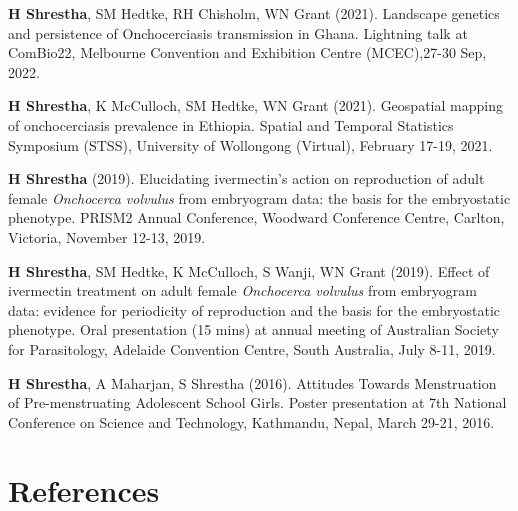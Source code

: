 \documentclass[11pt,a4paper,]{awesome-cv}
\begin{document}
\begin{cventries}
{\begin{cvitems}
\item \textbf{H Shrestha}, SM Hedtke, RH Chisholm, WN Grant (2021). Landscape genetics and persistence of Onchocerciasis transmission in Ghana. Lightning talk at ComBio22, Melbourne Convention and Exhibition Centre (MCEC),27-30 Sep, 2022.
\item \textbf{H Shrestha}, K McCulloch, SM Hedtke, WN Grant (2021). Geospatial mapping of onchocerciasis prevalence in Ethiopia. Spatial and Temporal Statistics Symposium (STSS), University of Wollongong (Virtual), February 17-19, 2021.
\item \textbf{H Shrestha} (2019). Elucidating ivermectin's action on reproduction of adult female \textit{Onchocerca volvulus} from embryogram data: the basis for the embryostatic phenotype. PRISM2 Annual Conference, Woodward Conference Centre, Carlton, Victoria, November 12-13, 2019.
\item \textbf{H Shrestha}, SM Hedtke, K McCulloch, S Wanji, WN Grant (2019). Effect of ivermectin treatment on adult female \textit{Onchocerca volvulus} from embryogram data: evidence for periodicity of reproduction and the basis for the embryostatic phenotype. Oral presentation (15 mins) at annual meeting of Australian Society for Parasitology, Adelaide Convention Centre, South Australia, July 8-11, 2019.
\item \textbf{H Shrestha}, A Maharjan, S Shrestha (2016). Attitudes Towards Menstruation of Pre-menstruating Adolescent School Girls. Poster presentation at 7th National Conference on Science and Technology, Kathmandu, Nepal, March 29-21, 2016.
\end{cvitems}}
\end{cventries}

\hypertarget{References}{%
\section{References}\label{References}}

\newcommand*{\emaillink}[1]{{\fontsize{8pt}{1em}\bodyfont\scshape\color{awesome} #1}}

\newcommand{\cvdoublecolumn}[2]{%
	\begin{minipage}[t]{{.45\linewidth}}#1\end{minipage}%
	\hfill%
	\begin{minipage}[t]{{.45\linewidth}}#2\end{minipage}%
}

\newcommand{\cvreference}[5]{
	\entrytitlestyle{#1}\newline
	\descriptionstyle{#2}\newline
	\descriptionstyle{#3}\newline
	\faHome\acvHeaderIconSep~\descriptionstyle{#4}\newline
	\href{mailto:#5}{\faEnvelope\acvHeaderIconSep~\emaillink{#5}\newline}}
\end{document}

